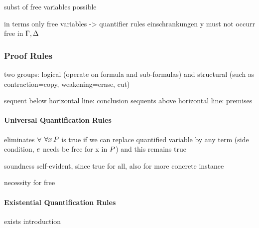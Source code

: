            subst of free variables possible

            in terms only free variables -> quantifier rules einschrankungen
            y must not occurr free in $\Gamma,\Delta$


            \subsubsection{Proof Rules}
                \label{sec:FOL-proof-rules}


                two groups: logical (operate on formula and sub-formulas) and structural (such as contraction=copy, weakening=erase, cut)


                sequent below horizontal line: conclusion
                sequents above horizontal line: premises

                \paragraph{Universal Quantification Rules}
                    eliminates $\forall$
                    $\forall x{\,} P$ is true if we can replace quantified variable by any term (side condition, $e$ needs be free for x in $P$) and this remains true



                    soundness self-evident, since true for all, also for more concrete instance

                    \begin{example}
                        necessity for free

                    \end{example}

                \paragraph{Existential Quantification Rules}
                    exists introduction

                    \begin{calculus}
                    \end{calculus}

